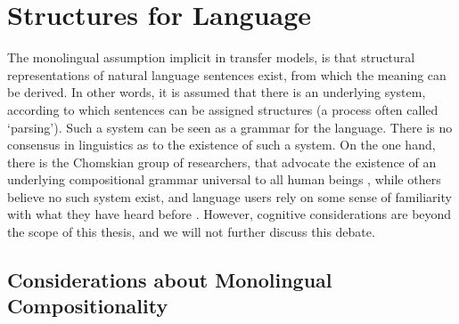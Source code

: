 \documentclass{report}
\begin{document}
\tableofcontents


%




 
%

 
% 


\section{Structures for Language}

The monolingual assumption implicit in transfer models, is that structural representations of natural language sentences exist, from which the meaning can be derived. In other words, it is assumed that there is an underlying system, according to which sentences can be assigned structures (a process often called `parsing'). Such a system can be seen as a grammar for the language. There is no consensus in linguistics as to the existence of such a system. On the one hand, there is the Chomskian group of researchers, that advocate the existence of an underlying compositional grammar universal to all human beings \citep[As first claimed in][]{chomsky1956three}, while others believe no such system exist, and language users rely on some sense of familiarity with what they have heard before \citep[e.g.,][]{scha1990taaltheorie, frank2012hierarchical}. However, cognitive considerations are beyond the scope of this thesis, and we will not further discuss this debate. 


\subsection{Considerations about Monolingual Compositionality}
\end{document}
